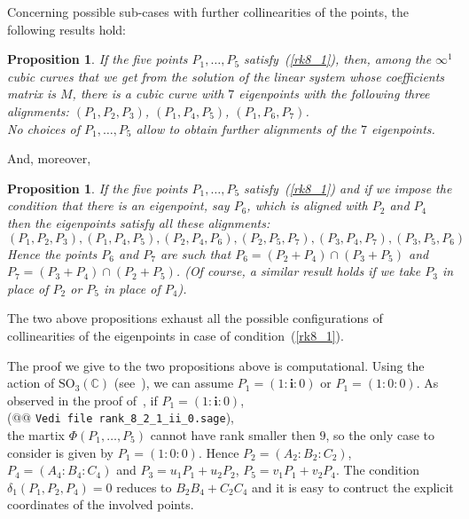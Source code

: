 \documentclass[11pt, a4paper, reqno, captions=tableheading,bibliography=totoc]{scrartcl}
\theoremstyle{plain}
\newtheorem{prop}[lemma]{Proposition}
\theoremstyle{definition}
\newcommand{\iii}{\textbf{i}}
\begin{document}
Concerning possible sub-cases with further collinearities of the points,
the following results hold:
\begin{prop}
\label{three_d_three_alignments}
If the five points $P_1, \dots, P_5$ satisfy~(\ref{rk8_1}),
then, among the $\infty^1$ cubic curves that we get from the
solution of the linear system whose coefficients matrix is $M$, there is 
a cubic curve with $7$ eigenpoints with the following three alignments:
$(P_1, P_2, P_3)$, $(P_1, P_4, P_5)$, $(P_1, P_6, P_7)$. \\
No choices of $P_1, \dots, P_5$ allow to obtain further alignments of the
$7$ eigenpoints.
\end{prop}
And, moreover,
\begin{prop}
\label{prop:d2_6allin}
If the five points $P_1, \dots, P_5$ satisfy~(\ref{rk8_1})
and if we impose the condition that there is an eigenpoint, say $P_6$, 
which is aligned with $P_2$ and $P_4$ then the eigenpoints satisfy all these
alignments:
\[
(P_1, P_2, P_3), (P_1, P_4, P_5), (P_2, P_4, P_6), (P_2, P_5, P_7),
(P_3, P_4, P_7), (P_3, P_5, P_6)
\]
Hence the points $P_6$ and $P_7$ are such that
$P_6 = (P_2+P_4) \cap (P_3+P_5)$
and $P_7 = (P_3+P_4) \cap (P_2+P_5)$.
(Of course, a similar result holds if we take $P_3$ in place of $P_2$ or $P_5$
in place of $P_4$).
\end{prop}
The two above propositions exhaust all the possible configurations
of collinearities of the eigenpoints in case of condition~(\ref{rk8_1}).

The proof we give to the two propositions above is computational.
Using the action of $\mathrm{SO}_3(\mathbb{C})$ (see~),
we can assume $P_1= (1: \iii: 0)$ or $P_1= (1: 0: 0)$. As observed
in the proof of~, if $P_1 = (1: \iii: 0)$,\\
(@@ \verb+Vedi file rank_8_2_1_ii_0.sage+), \\
the martix
$\Phi(P_1, \dots, P_5)$ cannot have rank smaller then $9$, so the only
case to consider is given by $P_1 = (1: 0: 0)$. Hence
$P_2 = (A_2: B_2: C_2)$, $P_4 = (A_4: B_4: C_4)$ and
$P_3 = u_1P_1+u_2P_2$, $P_5=v_1P_1+v_2P_4$.
The condition $\delta_1(P_1, P_2, P_4)=0$ reduces to $B_2B_4+C_2C_4$
and it is easy to contruct the explicit coordinates of the involved points.
\end{document}
